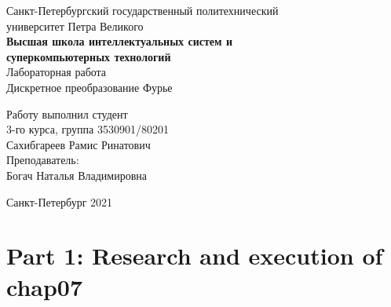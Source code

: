 \documentclass[a4paper]{article}
\begin{document}
    \begin{center}
        \begin{center}
        \hfill \break
        \normalsize{Санкт-Петербургский государственный политехнический}\\
        \normalsize{университет Петра Великого}\\
        \hfill \break
        \normalsize{\textbf{Высшая школа интеллектуальных систем и}}\\ 
        \normalsize{\textbf{суперкомпьютерных технологий}}\\ 
        \hfill \break
        \hfill \break
        \hfill \break
        \normalsize{Лабораторная работа}\\
        \hfill \break
        \hfill \break
        \normalsize{\LARGE Дискретное преобразование Фурье}\\
        \end{center}
        \hfill \break
        \hfill \break
        \hfill \break
        \hfill \break
        \hfill \break
        \hfill \break
        \hfill \break
        \hfill \break
        \hfill \break
        \hfill \break
        \begin{flushright}
            \normalsize{Работу выполнил студент}\\
            \normalsize{3-го курса, группа 3530901/80201}\\
            \normalsize{Сахибгареев Рамис Ринатович}\\
            \hfill \break
            \normalsize{Преподаватель:}\\
            \normalsize{Богач Наталья Владимировна}\\
        \end{flushright}
        \hfill \break
        \hfill \break
        \hfill \break
        \hfill \break
        \begin{center} Санкт-Петербург 2021 \end{center}
        \thispagestyle{empty}
    \end{center}
    
    \newpage
        \tableofcontents
    
    \newpage
         \listoffigures
    
    \newpage
         \lstlistoflistings   
     
    \newpage
        \section{Part 1: Research and execution of chap07}
        
\end{document}
